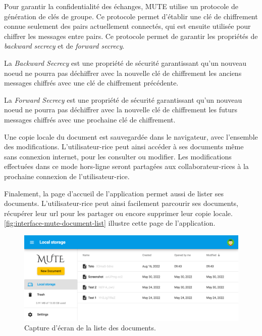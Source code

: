 Pour garantir la confidentialité des échanges, \ac{MUTE} utilise un protocole de génération de clés de groupe.
Ce protocole permet d'établir une clé de chiffrement connue seulement des pairs actuellement connectés, qui est ensuite utilisée pour chiffrer les messages entre pairs.
Ce protocole permet de garantir les propriétés de \emph{backward secrecy} et de \emph{forward secrecy}.
\begin{definition}
    \label{def:backward-secrecy}
    La \emph{Backward Secrecy} est une propriété de sécurité garantissant qu'un nouveau noeud ne pourra pas déchiffrer avec la nouvelle clé de chiffrement les anciens messages chiffrés avec une clé de chiffrement précédente.
\end{definition}
\begin{definition}
    \label{def:forward-secrecy}
    La \emph{Forward Secrecy} est une propriété de sécurité garantissant qu'un nouveau noeud ne pourra pas déchiffrer avec la nouvelle clé de chiffrement les futurs messages chiffrés avec une prochaine clé de chiffrement.
\end{definition}

Une copie locale du document est sauvegardée dans le navigateur, avec l'ensemble des modifications.
L'utilisateur-rice peut ainsi accéder à ses documents même sans connexion internet, pour les consulter ou modifier.
Les modifications effectuées dans ce mode hors-ligne seront partagées aux collaborateur-rices à la prochaine connexion de l'utilisateur-rice.

Finalement, la page d'accueil de l'application permet aussi de lister ses documents.
L'utilisateur-rice peut ainsi facilement parcourir ses documents, récupérer leur url pour les partager ou encore supprimer leur copie locale.
\autoref{fig:interface-mute-document-list} illustre cette page de l'application.
\begin{figure}[!ht]
    \centering
    \includegraphics[width=\linewidth]{img/screenshot-mute-document-list.png}
    \caption{Capture d'écran de la liste des documents.}
    \label{fig:interface-mute-document-list}
\end{figure}
